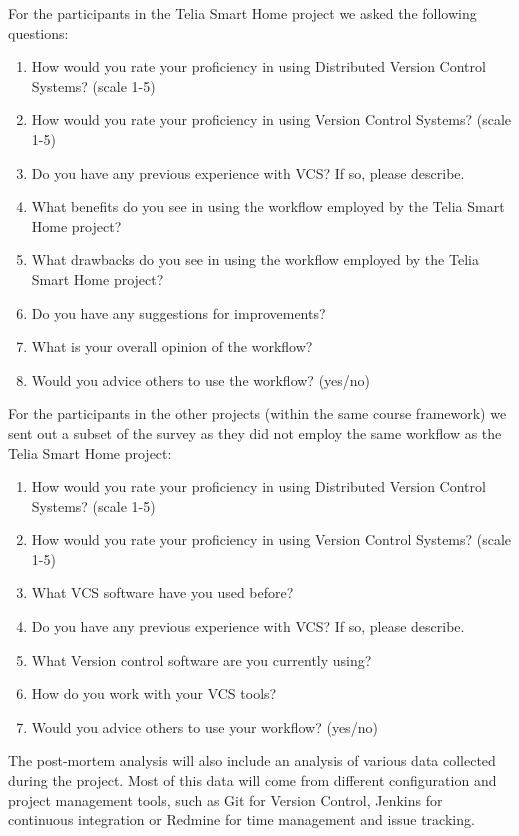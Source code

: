 \documentclass{llncs}
\begin{document}
For the participants in the Telia Smart Home project we asked the
following questions:

\begin{enumerate}
 \item How would you rate your proficiency in using Distributed
       Version Control Systems? (scale 1-5)
 \item How would you rate your proficiency in using Version Control
       Systems? (scale 1-5)
 \item Do you have any previous experience with VCS? If so, please
       describe.
 \item What benefits do you see in using the workflow employed by the
       Telia Smart Home project?
 \item What drawbacks do you see in using the workflow employed by the
       Telia Smart Home project?
 \item Do you have any suggestions for improvements?
 \item What is your overall opinion of the workflow?
 \item Would you advice others to use the workflow? (yes/no)
\end{enumerate}

For the participants in the other projects (within the same course
framework) we sent out a subset of the survey as they did not employ
the same workflow as the Telia Smart Home project:

\begin{enumerate}
 \item How would you rate your proficiency in using Distributed
       Version Control Systems? (scale 1-5)
 \item How would you rate your proficiency in using Version Control
       Systems? (scale 1-5)
 \item What VCS software have you used before?
 \item Do you have any previous experience with VCS? If so, please
       describe.
 \item What Version control software are you currently using?
 \item How do you work with your VCS tools?
 \item Would you advice others to use your workflow? (yes/no)
\end{enumerate}

The post-mortem analysis will also include an analysis of various data
collected during the project. Most of this data will come from
different configuration and project management tools, such as Git for
Version Control, Jenkins for continuous integration or Redmine for
time management and issue tracking.
\end{document}
